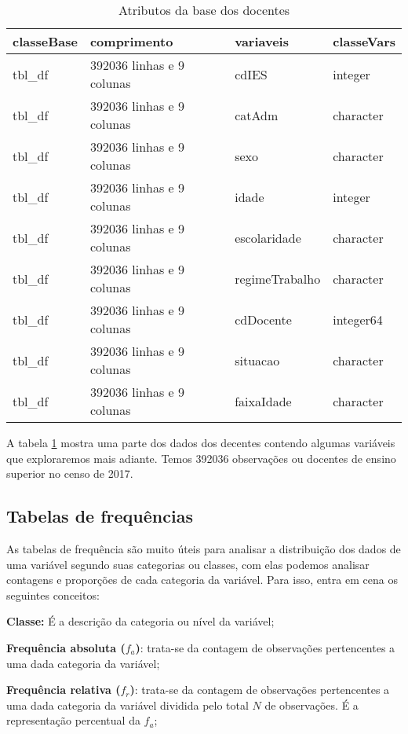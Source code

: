 \documentclass[12pt,]{style/krantz}
\theoremstyle{definition}
\theoremstyle{definition}
\theoremstyle{definition}
\theoremstyle{remark}
\begin{document}
\begin{table}[!h]

\caption{\label{tab:tab03}Atributos da base dos docentes}
\centering
\begin{tabular}{llll}
\toprule
classeBase & comprimento & variaveis & classeVars\\
\midrule
tbl\_df & 392036 linhas e 9 colunas & cdIES & integer\\
tbl\_df & 392036 linhas e 9 colunas & catAdm & character\\
tbl\_df & 392036 linhas e 9 colunas & sexo & character\\
tbl\_df & 392036 linhas e 9 colunas & idade & integer\\
tbl\_df & 392036 linhas e 9 colunas & escolaridade & character\\
\addlinespace
tbl\_df & 392036 linhas e 9 colunas & regimeTrabalho & character\\
tbl\_df & 392036 linhas e 9 colunas & cdDocente & integer64\\
tbl\_df & 392036 linhas e 9 colunas & situacao & character\\
tbl\_df & 392036 linhas e 9 colunas & faixaIdade & character\\
\bottomrule
\end{tabular}
\end{table}

A tabela \ref{tab:tab03} mostra uma parte dos dados dos decentes contendo algumas variáveis que exploraremos mais adiante. Temos 392036 observações ou docentes de ensino superior no censo de 2017.

\hypertarget{tabelas-de-frequencias}{%
\subsection{Tabelas de frequências}\label{tabelas-de-frequencias}}

As tabelas de frequência são muito úteis para analisar a distribuição dos dados de uma variável segundo suas categorias ou classes, com elas podemos analisar contagens e proporções de cada categoria da variável. Para isso, entra em cena os seguintes conceitos:

\textbf{Classe:} É a descrição da categoria ou nível da variável;

\textbf{Frequência absoluta (\(f_{a}\))}: trata-se da contagem de observações pertencentes a uma dada categoria da variável;

\textbf{Frequência relativa (\(f_{r}\))}: trata-se da contagem de observações pertencentes a uma dada categoria da variável dividida pelo total \(N\) de observações. É a representação percentual da \(f_{a}\);
\end{document}
